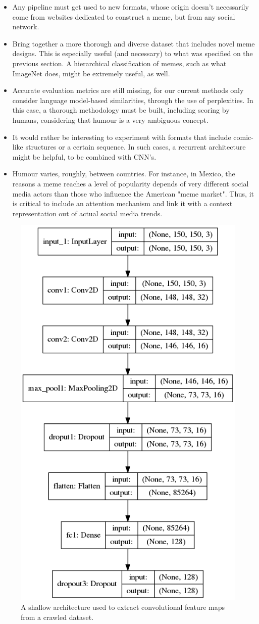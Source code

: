 \documentclass[paper=letter, fontsize=11pt]{scrartcl}
\begin{document}
\begin{itemize}
    \item Any pipeline must get used to new formats, whose origin doesn't necessarily come from websites dedicated to construct a meme, but from any social network. 
    \item Bring together a more thorough and diverse dataset that includes novel meme designs. This is especially useful (and necessary) to what was specified on the previous section. A hierarchical classification of memes, such as what ImageNet does, might be extremely useful, as well.
    \item Accurate evaluation metrics are still missing, for our current methods only consider language model-based similarities, through the use of perplexities. In this case, a thorough methodology must be built, including scoring by humans, considering that humour is a very ambiguous concept.
    \item It would rather be interesting to experiment with formats that include comic-like structures or a certain sequence. In such cases, a recurrent architecture might be helpful, to be combined with CNN's.
    \item Humour varies, roughly, between countries. For instance, in Mexico, the reasons a meme reaches a level of popularity depends of very different social media actors than those who influence the American "meme market". Thus, it is critical to include an attention mechanism and link it with a context representation out of actual social media trends.
\end{itemize}

\printbibliography[title={Bibliography}]


  \begin{figure}[h]
    \centering
    \includegraphics[width=0.45\linewidth]{img/model.png}
    \caption{
        A shallow architecture used to extract convolutional feature maps from a crawled dataset.
    }
    \label{fig3}
\end{figure}
\end{document}
